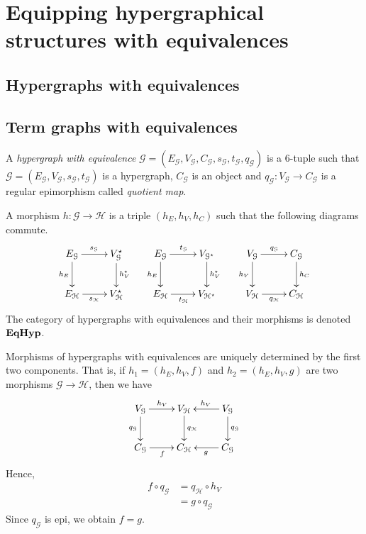 \section{Equipping hypergraphical structures with equivalences}


\subsection{Hypergraphs with equivalences}

\subsection{Term graphs with equivalences}


\begin{definition}
	A \emph{hypergraph with equivalence} $\mathcal{G} = (E_\mathcal{G}, V_{\mathcal{G}}, C_\mathcal{G}, s_\mathcal{G}, t_\mathcal{G}, q_\mathcal{G})$ is a 6-tuple such that $\mathcal{G} = (E_\mathcal{G}, V_{\mathcal{G}}, s_\mathcal{G}, t_\mathcal{G})$ is a hypergraph, $C_\mathcal{G}$ is an object and $q_{\mathcal{G}}: V_{\mathcal{G}}\to C_{\mathcal{G}}$ is a regular epimorphism called \emph{quotient map}. 
	
	A morphism $h:\mathcal{G\to H}$ is a triple $(h_E, h_V, h_C)$ such that the following diagrams commute.
	\[\xymatrix{
		{E_\mathcal{G}}\ar[r]^{s_\mathcal{G}}\ar[d]_{h_E} & {V_{\mathcal{G}}^\star}\ar[d]^{h_V^\star} & {E_\mathcal{G}}\ar[r]^{t_\mathcal{G}}\ar[d]_{h_E} & {V_{\mathcal{G}^\star}}\ar[d]^{h_V^\star} & {V_\mathcal{G}}\ar[r]^{q_\mathcal{G}}\ar[d]_{h_V} & {C_{\mathcal{G}}} \ar[d]^{h_C} \\
		{E_\mathcal{H}}\ar[r]_{s_\mathcal{H}} & {V_{\mathcal{H}}^\star}	& {E_\mathcal{H}}\ar[r]_{t_\mathcal{H}} & {V_{\mathcal{H}^\star}}& {V_\mathcal{H}}\ar[r]_{q_\mathcal{H}} & {C_\mathcal{H}}
	}\]
	The category of hypergraphs with equivalences and their morphisms is denoted $\textbf{\textup{EqHyp}}$.

\end{definition}

\begin{remark}\label{rem:eqhyp_morphs}
	Morphisms of hypergraphs with equivalences are uniquely determined by the first two components. That is, if $h_1 = (h_E, h_V, f)$ and $h_2 = (h_E, h_V, g)$ are two morphisms $\mathcal{G \to H}$, then we have
	\[\xymatrix{
			{V_\mathcal{G}} \ar[r]^{h_V}\ar[d]_{q_\mathcal{G}} & V_\mathcal{H} \ar[d]^{q_\mathcal{H}} & V_\mathcal{G}\ar[l]_{h_V}\ar[d]^{q_\mathcal{G}}\\
			C_{\mathcal{G}}\ar[r]_{f} & C_{\mathcal{H}} & C_{\mathcal{G}}\ar[l]^{g}
	}\]
	Hence,
	\begin{align*}
		f \circ q_\mathcal{G} &= q_\mathcal{H}\circ h_V \\ &=g\circ q_\mathcal{G}
	\end{align*}
	Since $q_\mathcal{G}$ is epi, we obtain $f = g$.
\end{remark}

